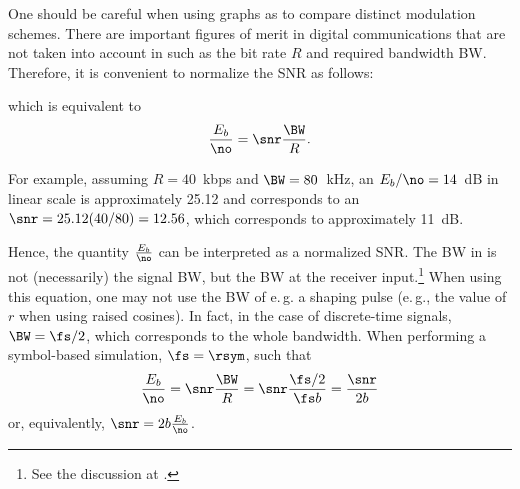 
One should be careful when using graphs as  to compare distinct modulation schemes. There are important figures of merit in digital communications that are not taken into account in  such as the bit rate $R$ and required bandwidth BW. Therefore, it is convenient to normalize the SNR as follows:

which is equivalent to
\begin{equation}
\frac{E_b}{\no} = \snr \frac{\BW}{R}.
\label{eq:ebn0}
\end{equation}

For example, assuming $R=40$~kbps and $\BW=80$~kHz, an $E_b / \no=14$~dB in linear scale is approximately 25.12 and corresponds to an $\snr=25.12(40/80)=12.56$, which corresponds to approximately 11~dB.

Hence, the quantity $\frac{E_b}{\no}$ can be interpreted as a normalized SNR. The BW in  is not (necessarily) the signal BW, but the BW at the receiver input.\footnote{See the discussion at .} When using this equation, one may not use the BW of e.\,g. a shaping pulse (e.\,g., the value of $r$ when using raised cosines). In fact, in the case of discrete-time signals, $\BW= \fs/2$, which corresponds to the whole bandwidth.
When performing a symbol-based simulation, $\fs = \rsym$, such that
\begin{equation}
\frac{E_b}{\no} = \snr \frac{\BW}{R} = \snr \frac{\fs/2}{\fs b} = \frac{\snr}{2 b}
\label{eq:ebn0_snr}
\end{equation}
or, equivalently, $\snr = 2b \frac{E_b}{\no}$.

